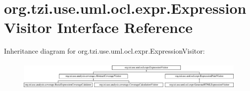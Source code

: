 \hypertarget{interfaceorg_1_1tzi_1_1use_1_1uml_1_1ocl_1_1expr_1_1_expression_visitor}{\section{org.\-tzi.\-use.\-uml.\-ocl.\-expr.\-Expression\-Visitor Interface Reference}
\label{interfaceorg_1_1tzi_1_1use_1_1uml_1_1ocl_1_1expr_1_1_expression_visitor}
}
Inheritance diagram for org.\-tzi.\-use.\-uml.\-ocl.\-expr.\-Expression\-Visitor\-:\begin{figure}[H]
\begin{center}
\leavevmode
\includegraphics[height=1.432225cm]{interfaceorg_1_1tzi_1_1use_1_1uml_1_1ocl_1_1expr_1_1_expression_visitor}
\end{center}
\end{figure}
